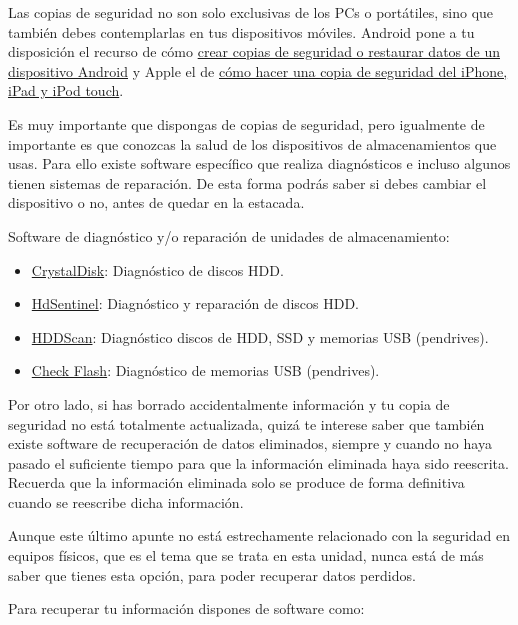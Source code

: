 \documentclass[
  spanish,
  a4paper,
  openany]{book}
\begin{document}
Las copias de seguridad no son solo exclusivas de los PCs o portátiles, sino que también debes contemplarlas en tus dispositivos móviles. Android pone a tu disposición el recurso de cómo \href{https://support.google.com/android/answer/2819582?hl=es\&visit_id=637514255756661953-3969236140\&rd=1}{crear copias de seguridad o restaurar datos de un dispositivo Android} y Apple el de \href{https://support.apple.com/es-es/HT203977}{cómo hacer una copia de seguridad del iPhone, iPad y iPod touch}.

Es muy importante que dispongas de copias de seguridad, pero igualmente de importante es que conozcas la salud de los dispositivos de almacenamientos que usas. Para ello existe software específico que realiza diagnósticos e incluso algunos tienen sistemas de reparación. De esta forma podrás saber si debes cambiar el dispositivo o no, antes de quedar en la estacada.

Software de diagnóstico y/o reparación de unidades de almacenamiento:

\begin{itemize}
\item
  \href{https://crystalmark.info/en/software/crystaldiskinfo/}{CrystalDisk}: Diagnóstico de discos HDD.
\item
  \href{https://www.hdsentinel.com/}{HdSentinel}: Diagnóstico y reparación de discos HDD.
\item
  \href{https://hddscan.com/}{HDDScan}: Diagnóstico discos de HDD, SSD y memorias USB (pendrives).
\item
  \href{http://mikelab.kiev.ua/index_en.php?page=PROGRAMS/chkflsh_en}{Check Flash}: Diagnóstico de memorias USB (pendrives).
\end{itemize}

Por otro lado, si has borrado accidentalmente información y tu copia de seguridad no está totalmente actualizada, quizá te interese saber que también existe software de recuperación de datos eliminados, siempre y cuando no haya pasado el suficiente tiempo para que la información eliminada haya sido reescrita. Recuerda que la información eliminada solo se produce de forma definitiva cuando se reescribe dicha información.

Aunque este último apunte no está estrechamente relacionado con la seguridad en equipos físicos, que es el tema que se trata en esta unidad, nunca está de más saber que tienes esta opción, para poder recuperar datos perdidos.

Para recuperar tu información dispones de software como:
\end{document}
